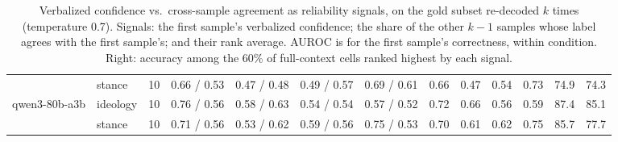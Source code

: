 \begin{table}[t]
{\begin{tabular}{llc|cccc|cccc|cc}
 & stance & 10 & 0.66 / 0.53 & 0.47 / 0.48 & 0.49 / 0.57 & 0.69 / 0.61 & 0.66 & 0.47 & 0.54 & 0.73 & 74.9 & 74.3 \\
qwen3-80b-a3b & ideology & 10 & 0.76 / 0.56 & 0.58 / 0.63 & 0.54 / 0.54 & 0.57 / 0.52 & 0.72 & 0.66 & 0.56 & 0.59 & 87.4 & 85.1 \\
 & stance & 10 & 0.71 / 0.56 & 0.53 / 0.62 & 0.59 / 0.56 & 0.75 / 0.53 & 0.70 & 0.61 & 0.62 & 0.75 & 85.7 & 77.7 \\
\bottomrule
\end{tabular}}
\caption{Verbalized confidence vs.\ cross-sample agreement as reliability signals, on the gold subset re-decoded $k$ times (temperature 0.7). Signals: the first sample's verbalized confidence; the share of the other $k{-}1$ samples whose label agrees with the first sample's; and their rank average. AUROC is for the first sample's correctness, within condition. Right: accuracy among the 60\% of full-context cells ranked highest by each signal.}
\label{tab:agreement}
\end{table}
